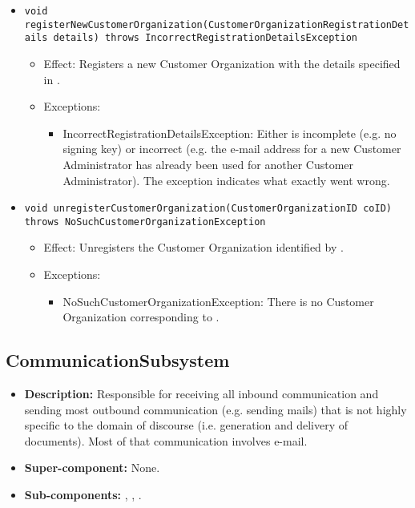 \begin{itemize}
\begin{itemize}
		\item \texttt{void registerNewCustomerOrganization(CustomerOrganizationRegistrationDetails details) throws IncorrectRegistrationDetailsException}
		    \begin{itemize}
                \item Effect: Registers a new Customer Organization with the details specified in .
                \item Exceptions:
				\begin{itemize}
					\item IncorrectRegistrationDetailsException: Either  is incomplete (e.g. no signing key) or incorrect (e.g. the e-mail address for a new Customer Administrator has already been used for another Customer Administrator). The exception indicates what exactly went wrong.
				\end{itemize}
            \end{itemize}

		\item \texttt{void unregisterCustomerOrganization(CustomerOrganizationID coID) throws NoSuchCustomerOrganizationException}
		    \begin{itemize}
                \item Effect: Unregisters the Customer Organization identified by .
                \item Exceptions:
				\begin{itemize}
					\item NoSuchCustomerOrganizationException: There is no Customer Organization corresponding to .
				\end{itemize}
            \end{itemize}
    \end{itemize}
\end{itemize}

\subsection{CommunicationSubsystem}
\begin{itemize}
    \item \textbf{Description:} Responsible for receiving all inbound communication and sending most outbound communication (e.g. sending mails) that is not highly specific to the domain of discourse (i.e. generation and delivery of documents). Most of that communication involves e-mail.
    \item \textbf{Super-component:} None.
    \item \textbf{Sub-components:} , , .
\end{itemize}

